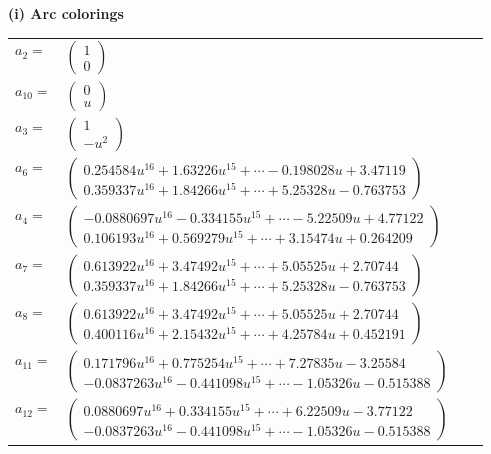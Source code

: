 \documentclass[1p]{elsarticle_modified}
\theoremstyle{definition}
\begin{document}
\flushleft \textbf{(i) Arc colorings}\\
\begin{tabular}{m{7pt} m{180pt} m{7pt} m{180pt} }
\flushright $a_{2}=$&$\begin{pmatrix}1\\0\end{pmatrix}$ \\
\flushright $a_{10}=$&$\begin{pmatrix}0\\u\end{pmatrix}$ \\
\flushright $a_{3}=$&$\begin{pmatrix}1\\- u^2\end{pmatrix}$ \\
\flushright $a_{6}=$&$\begin{pmatrix}0.254584 u^{16}+1.63226 u^{15}+\cdots-0.198028 u+3.47119\\0.359337 u^{16}+1.84266 u^{15}+\cdots+5.25328 u-0.763753\end{pmatrix}$ \\
\flushright $a_{4}=$&$\begin{pmatrix}-0.0880697 u^{16}-0.334155 u^{15}+\cdots-5.22509 u+4.77122\\0.106193 u^{16}+0.569279 u^{15}+\cdots+3.15474 u+0.264209\end{pmatrix}$ \\
\flushright $a_{7}=$&$\begin{pmatrix}0.613922 u^{16}+3.47492 u^{15}+\cdots+5.05525 u+2.70744\\0.359337 u^{16}+1.84266 u^{15}+\cdots+5.25328 u-0.763753\end{pmatrix}$ \\
\flushright $a_{8}=$&$\begin{pmatrix}0.613922 u^{16}+3.47492 u^{15}+\cdots+5.05525 u+2.70744\\0.400116 u^{16}+2.15432 u^{15}+\cdots+4.25784 u+0.452191\end{pmatrix}$ \\
\flushright $a_{11}=$&$\begin{pmatrix}0.171796 u^{16}+0.775254 u^{15}+\cdots+7.27835 u-3.25584\\-0.0837263 u^{16}-0.441098 u^{15}+\cdots-1.05326 u-0.515388\end{pmatrix}$ \\
\flushright $a_{12}=$&$\begin{pmatrix}0.0880697 u^{16}+0.334155 u^{15}+\cdots+6.22509 u-3.77122\\-0.0837263 u^{16}-0.441098 u^{15}+\cdots-1.05326 u-0.515388\end{pmatrix}$ \\

\end{tabular}
\end{document}
